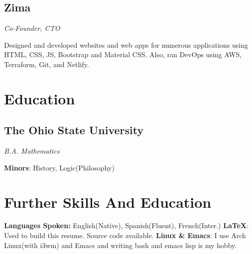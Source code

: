 \documentclass[letterpaper,11pt]{article}
\begin{document}
\subsection{Zima}
\textit{Co-Founder, CTO}
\vspace{2mm}
\begin{adjustwidth}{1cm}{1cm}
Designed and developed websites and web
apps for numerous applications using
HTML, CSS, JS, Bootstrap and Material CSS.
Also, ran DevOps using AWS, Terraform,
Git, and Netlify.
\end{adjustwidth}
\section{Education}
\subsection{The Ohio State University}
\textit{B.A. Mathematics}
\vspace{2mm}
\begin{adjustwidth}{1cm}{1cm}
\textbf{Minors}: History, Logic(Philosophy)
\end{adjustwidth}
\section{Further Skills And Education}
\textbf{Languages Spoken: } English(Native), Spanish(Fluent), French(Inter.)
\newline
\textbf{\LaTeX}: Used to build this resume. Source code available.
\newline
\textbf{Linux \& Emacs}: I use Arch Linux(with i3wm) and Emacs and writing bash and emacs lisp is my hobby.
\newline
\end{document}
